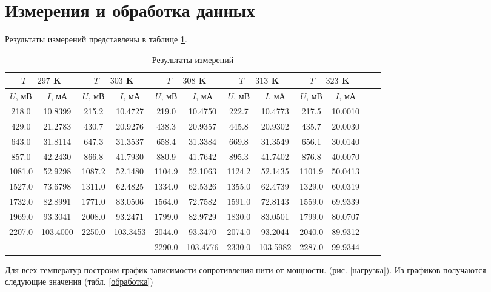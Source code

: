 \documentclass[a4paper,12pt]{article} %
\begin{document}
\section{Измерения и обработка данных}
Результаты измерений представлены в таблице \ref{результаты}.
\begin{table}[H]
	\caption{Результаты измерений}
	\label{результаты}
	\begin{tabular}{|c|c|c|c|c|c|c|c|c|c|c|c|}
		\hline
		\multicolumn{2}{|c|}{$T = 297$ K} & \multicolumn{2}{|c|}{$T = 303$ K} & \multicolumn{2}{|c|}{$T = 308$ K} & \multicolumn{2}{|c|}{$T = 313$ K} & \multicolumn{2}{|c|}{$T = 323$ K} \\ \hline
		$U$, мВ & $I$, мА & $U$, мВ & $I$, мА & $U$, мВ & $I$, мА & $U$, мВ & $I$, мА & $U$, мВ & $I$, мА \\ \hline
		218.0  & 10.8399  & 215.2  & 10.4727  & 219.0  & 10.4750 & 222.7  & 10.4773 & 217.5  & 10.0010 \\ \hline
		429.0  & 21.2783  & 430.7  & 20.9276  & 438.3  & 20.9357 & 445.8  & 20.9302 & 435.7  & 20.0030 \\ \hline
		643.0  & 31.8114  & 647.3  & 31.3537  & 658.4  & 31.3384 & 669.8  & 31.3549 & 656.1  & 30.0140 \\ \hline
		857.0  & 42.2430  & 866.8  & 41.7930  & 880.9  & 41.7642 & 895.3  & 41.7402 & 876.8  & 40.0070 \\ \hline
		1081.0 & 52.9298  & 1087.2 & 52.1480  & 1104.9 & 52.1063 & 1124.2 & 52.1435 & 1101.9 & 50.0413 \\ \hline
		1527.0 & 73.6798  & 1311.0 & 62.4825  & 1334.0 & 62.5326 & 1355.0 & 62.4739 & 1329.0 & 60.0319 \\ \hline
		1732.0 & 82.8991  & 1771.0 & 83.0506  & 1564.0 & 72.7582 & 1591.0 & 72.8143 & 1559.0 & 69.9339 \\ \hline
		1969.0 & 93.3041  & 2008.0 & 93.2471  & 1799.0 & 82.9729 & 1830.0 & 83.0501 & 1799.0 & 80.0707 \\ \hline
		2207.0 & 103.4000 & 2250.0 & 103.3453 & 2044.0 & 93.3470 & 2074.0 & 93.2044 & 2040.0 & 89.9312 \\ \hline
		 &  &  &  & 2290.0 & 103.4776 & 2330.0 & 103.5982 & 2287.0 & 99.9344 \\ \hline
	\end{tabular}
\end{table}
Для всех температур построим график зависимости сопротивления нити от мощности. (рис. \ref{нагрузка}). Из графиков получаются следующие значения (табл. \ref{обработка})
\end{document}
